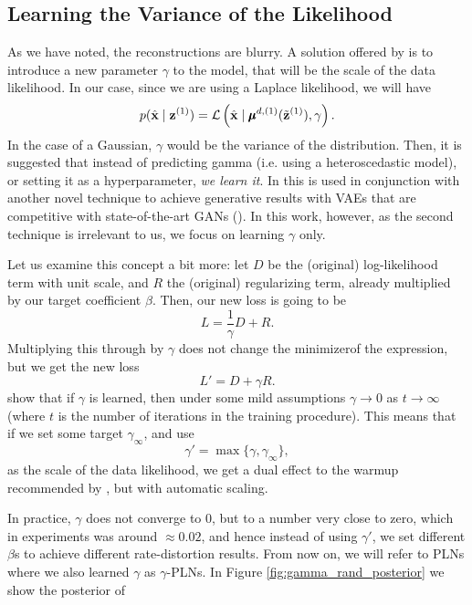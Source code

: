 \subsection{Learning the Variance of the Likelihood}
\label{sec:learn_gamma}
\par
As we have noted, the reconstructions are blurry.
A solution offered by \cite{dai2019diagnosing} is to introduce a new parameter
$\gamma$ to the model, that will be the scale of the data likelihood. In our
case, since we are using a Laplace likelihood, we will have
\[
  p(\hat{\mathbf{x}} \mid \mathbf{z}^{(1)}) = \mathcal{L}\left( \hat{\mathbf{x}} \mid \pmb{\mu}^{d,
      (1)}(\tilde{\mathbf{z}}^{(1)}), \gamma \right).
\]
In the case of a Gaussian, $\gamma$ would be the variance of the distribution.
Then, it is suggested that instead of predicting gamma (i.e. using a
heteroscedastic model), or setting it as a hyperparameter, \textit{we learn it}.
In \cite{dai2019diagnosing} this is used in conjunction with another novel
technique to achieve generative results with VAEs that are competitive with
state-of-the-art GANs (\cite{goodfellow2014generative}). In this work, however,
as the second technique is irrelevant to us, we focus on learning $\gamma$ only.
\par
Let us examine this concept a bit more: let $D$ be the (original) log-likelihood
term with unit scale, and $R$ the (original) regularizing term, already
multiplied by our target coefficient $\beta$. Then, our new loss is going to be
\[
  L = \frac{1}{\gamma}D + R.
\]
Multiplying this through by $\gamma$ does not change the minimizer\footnotemark of the
expression, but we get the new loss
\[
  L' = D + \gamma R.
\]
\cite{dai2019diagnosing} show that if $\gamma$ is learned, then under some mild
assumptions $\gamma \rightarrow 0$ as $t \rightarrow \infty$ (where $t$ is the
number of iterations in the training procedure). This means that if we set some
target $\gamma_\infty$, and use
\[
  \gamma' = \max\{ \gamma, \gamma_\infty \},
\]
as the scale of the data likelihood, we get a dual effect to the warmup
recommended by \cite{sonderby2016train}, but with automatic scaling.
\par
In practice, $\gamma$ does not converge to 0, but to a number very close to
zero, which in experiments was around $\approx 0.02$, and hence instead of using
$\gamma'$, we set different $\beta$s to achieve different rate-distortion
results. From now on, we will refer to PLNs where we also learned $\gamma$ as
$\gamma$-PLNs. In Figure \ref{fig:gamma_rand_posterior} we show the posterior of 
